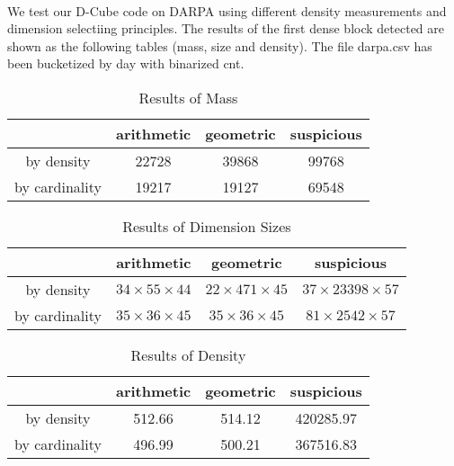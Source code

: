 \paragraph{} We test our D-Cube\cite{shin2017dcube} code on DARPA using different density measurements and dimension selectiing principles. The results of the first dense block detected are shown as the following tables (mass, size and density). The file darpa.csv has been bucketized by day with binarized cnt.\\

\begin{table}[htb]
\begin{center}
\begin{tabular}{|c|c|c|c|}
  \hline 
  & arithmetic & geometric & suspicious\\\hline
  by density & 22728 & 39868 & 99768\\\hline
  by cardinality & 19217 & 19127 & 69548 \\
  \hline
\end{tabular}
\caption{Results of Mass}
\label{tab:mass}
\end{center}
\end{table}

\begin{table}[htb]
\begin{center}
\begin{tabular}{|c|c|c|c|}
  \hline 
  & arithmetic & geometric & suspicious\\\hline
  by density & $34 \times 55 \times 44$ &  $22\times 471\times 45$ & $37\times 23398\times 57$\\\hline
  by cardinality &  $35\times 36\times 45$ & $35\times 36\times 45$ & $81\times 2542\times 57$ \\
  \hline
\end{tabular}
\caption{Results of Dimension Sizes}
\label{tab:size}
\end{center}
\end{table}

\begin{table}[htb]
\begin{center}
\begin{tabular}{|c|c|c|c|}
  \hline 
  & arithmetic & geometric & suspicious\\\hline
  by density & 512.66 &  514.12 & 420285.97\\\hline
  by cardinality &  496.99 & 500.21 & 367516.83 \\
  \hline
\end{tabular}
\caption{Results of Density}
\label{tab:size}
\end{center}
\end{table}